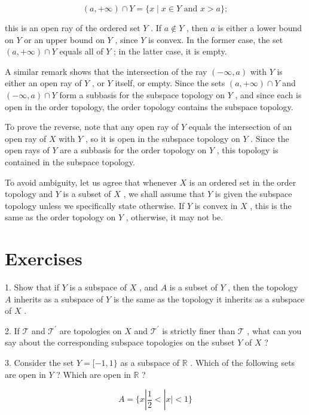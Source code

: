 \documentclass[10pt]{article}
\begin{document}
\[
\left( {a, + \infty }\right)  \cap  Y = \{ x \mid  x \in  Y\text{ and }x > a\} ;
\]

this is an open ray of the ordered set \(Y\) . If \(a \notin  Y\) , then \(a\) is either a lower bound on \(Y\) or an upper bound on \(Y\) , since \(Y\) is convex. In the former case, the set \(\left( {a, + \infty }\right)  \cap  Y\) equals all of \(Y\) ; in the latter case, it is empty.

A similar remark shows that the intersection of the ray \(\left( {-\infty ,a}\right)\) with \(Y\) is either an open ray of \(Y\) , or \(Y\) itself, or empty. Since the sets \(\left( {a, + \infty }\right)  \cap  Y\) and \(\left( {-\infty ,a}\right)  \cap  Y\) form a subbasis for the subspace topology on \(Y\) , and since each is open in the order topology, the order topology contains the subspace topology.

To prove the reverse, note that any open ray of \(Y\) equals the intersection of an open ray of \(X\) with \(Y\) , so it is open in the subspace topology on \(Y\) . Since the open rays of \(Y\) are a subbasis for the order topology on \(Y\) , this topology is contained in the subspace topology.

To avoid ambiguity, let us agree that whenever \(X\) is an ordered set in the order topology and \(Y\) is a subset of \(X\) , we shall assume that \(Y\) is given the subspace topology unless we specifically state otherwise. If \(Y\) is convex in \(X\) , this is the same as the order topology on \(Y\) , otherwise, it may not be.

\section*{Exercises}

1. Show that if \(Y\) is a subspace of \(X\) , and \(A\) is a subset of \(Y\) , then the topology \(A\) inherits as a subspace of \(Y\) is the same as the topology it inherits as a subspace of \(X\) .

2. If \(\mathcal{T}\) and \({\mathcal{T}}^{\prime }\) are topologies on \(X\) and \({\mathcal{T}}^{\prime }\) is strictly finer than \(\mathcal{T}\) , what can you say about the corresponding subspace topologies on the subset \(Y\) of \(X\) ?

3. Consider the set \(Y = \lbrack  - 1,1\}\) as a subspace of \(\mathbb{R}\) . Which of the following sets are open in \(Y\) ? Which are open in \(\mathbb{R}\) ?

\[
A = \{ x\left| {\frac{1}{2} < }\right| x \mid   < 1\}
\]
\end{document}
